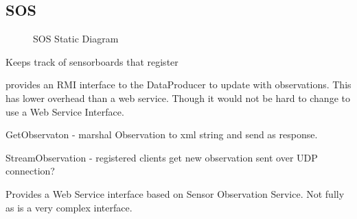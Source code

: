 \documentclass[]{final_report}
\begin{document}
\subsection {SOS}
 \begin{figure}[h!]
\caption{SOS Static Diagram}\label{fig:bon_static_diagam_provider.png}
\end{figure}
Keeps track of sensorboards that register

provides an RMI interface to the DataProducer to update with observations. This has lower overhead
than a web service. Though it would not be hard to change to use a Web Service Interface.

GetObservaton - marshal Observation to xml string and send as response.

StreamObservation -  registered clients get new observation sent over UDP connection?

Provides a Web Service interface  based on Sensor Observation Service. Not fully as is a very complex interface.
\end{document}
